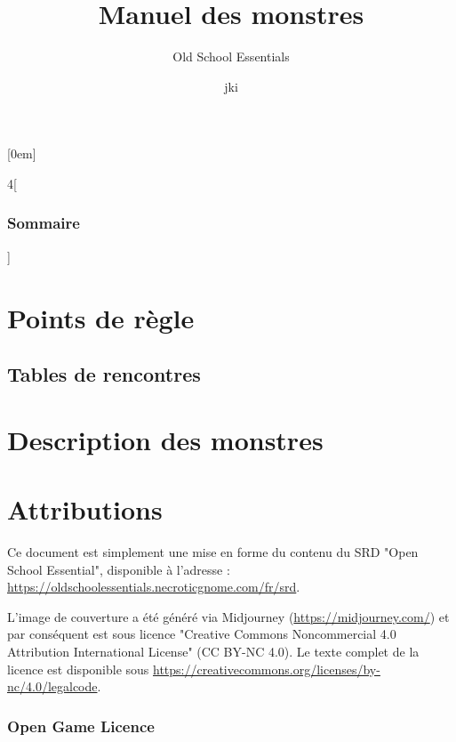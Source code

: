\documentclass[10pt]{report}
\title{Manuel des monstres}
\subtitle{Old School Essentials}
\author{jki}
\makeatletter
\renewcommand\tableofcontents{%
	\@starttoc{toc}%
}
\makeatother
\begin{document}
\maketitle

[0em]
{\small}%
{}%
{}%
{\contentspage}%
\renewcommand{\baselinestretch}{0.5}\normalsize
\renewcommand{\contentsname}{Sommaire}
\begin{multicols}{4}[\section*{\contentsname}]
\tableofcontents
\end{multicols}
\renewcommand{\baselinestretch}{1.0}\normalsize

\part{Points de règle}


\chapter{Tables de rencontres}

\pagebreak

\pagebreak


\part{Description des monstres}

%
	
\part{Attributions}	

Ce document est simplement une mise en forme du contenu du SRD "Open School Essential", disponible à l'adresse :
\url{https://oldschoolessentials.necroticgnome.com/fr/srd}.

L'image de couverture a été généré via Midjourney (\url{https://midjourney.com/}) et par conséquent est sous licence "Creative Commons Noncommercial 4.0 Attribution International License" (CC BY-NC 4.0).
Le texte complet de la licence est disponible sous \url{https://creativecommons.org/licenses/by-nc/4.0/legalcode}.

\section*{Open Game Licence}

	
\end{document}
